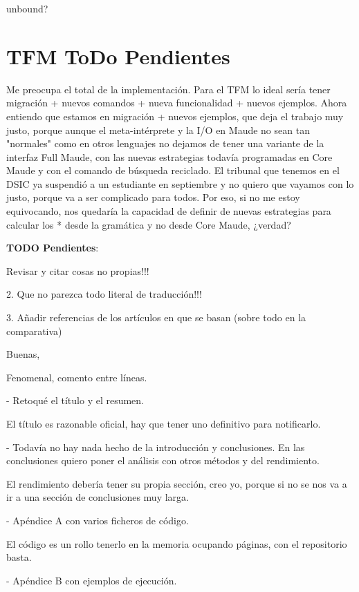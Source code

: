 unbound?



\section{TFM ToDo Pendientes}

Me preocupa el total de la implementación. Para el TFM lo ideal sería tener migración + nuevos
comandos + nueva funcionalidad + nuevos ejemplos. Ahora entiendo que estamos en
migración + nuevos ejemplos, que deja el trabajo muy justo, porque aunque el meta-intérprete
y la I/O en Maude no sean tan "normales" como en otros lenguajes no dejamos de tener una
variante de la interfaz Full Maude, con las nuevas estrategias todavía programadas en Core
Maude y con el comando de búsqueda reciclado. El tribunal que tenemos en el DSIC ya suspendió 
a un estudiante en septiembre y no quiero que vayamos con lo justo, porque va a ser complicado
para todos. Por eso, si no me estoy equivocando, nos quedaría la capacidad de definir de nuevas
estrategias para calcular los * desde la gramática y no desde Core Maude, ¿verdad?
\medskip

\textbf{TODO Pendientes}:

Revisar y citar cosas no propias!!!

2. Que no parezca todo literal de traducción!!!

3. Añadir referencias de los artículos en que se basan (sobre todo en la comparativa)
\medskip



Buenas,

Fenomenal, comento entre líneas.

- Retoqué el título y el resumen.

El título es razonable oficial, hay que tener uno definitivo para notificarlo.
 
- Todavía no hay nada hecho de la introducción y conclusiones. En las conclusiones quiero poner el análisis con otros métodos y del rendimiento.

El rendimiento debería tener su propia sección, creo yo, porque si no se nos va a ir a una sección de conclusiones muy larga. 
 
- Apéndice A con varios ficheros de código.

El código es un rollo tenerlo en la memoria ocupando páginas, con el repositorio basta.
 
- Apéndice B con ejemplos de ejecución.

